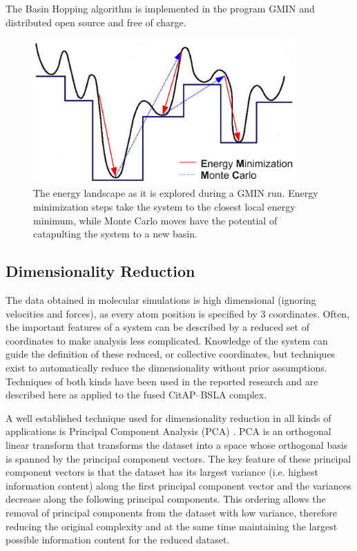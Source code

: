 \documentclass[english, a4paper, 12pt, titlepage, draft]{article}
\begin{document}
The Basin Hopping algorithm is implemented in the program GMIN \cite{GMIN} and distributed open source and free of charge.

\begin{figure}
    \centering
    \includegraphics[width=0.9\textwidth]{figures/GMIN/GMIN.pdf}
    \caption{The energy landscape as it is explored during a GMIN run. Energy minimization steps take the system to the closest local energy minimum, while Monte Carlo moves have the potential of catapulting the system to a new basin.}
    \label{fig:GMIN}
\end{figure}        




\subsection{Dimensionality Reduction}

The data obtained in molecular simulations is high dimensional (ignoring velocities and forces), as every atom position is specified by 3 coordinates.
Often, the important features of a system can be described by a reduced set of coordinates to make analysis less complicated.
Knowledge of the system can guide the definition of these reduced, or collective coordinates, but techniques exist to automatically reduce the dimensionality without prior assumptions.
Techniques of both kinds have been used in the reported research and are described here as applied to the fused CitAP--BSLA complex.

A well established technique used for dimensionality reduction in all kinds of applications is Principal Component Analysis (PCA) \cite{PCAoriginal} \cite{PCA}.
PCA is an orthogonal linear transform that transforms the dataset into a space whose orthogonal basis is spanned by the principal component vectors.
The key feature of these principal component vectors is that the dataset has its largest variance (i.e. highest information content) along the first principal component vector and the variances decrease along the following principal components.
This ordering allows the removal of principal components from the dataset with low variance, therefore reducing the original complexity and at the same time maintaining the largest possible information content for the reduced dataset.
\end{document}
